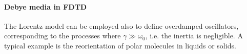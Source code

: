 
\paragraph{Debye media in FDTD} \label{fdtd_debye} %
The Lorentz model can be employed also to define overdamped oscillators, corresponding to the processes where  $\gamma \gg \omega_0$, i.e. the inertia is negligible.
A typical example is the  reorientation of polar molecules in liquids or solids. 

